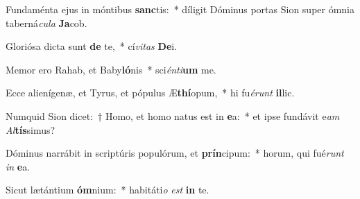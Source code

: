 \item Fundaménta ejus in móntibus \textbf{sanc}tis:~* díligit Dóminus portas Sion super ómnia taberná\textit{cu}\textit{la} \textbf{Ja}cob.
\item Gloriósa dicta sunt \textbf{de} te,~* cí\textit{vi}\textit{tas} \textbf{De}i.
\item Memor ero Rahab, et Baby\textbf{ló}nis~* sci\textit{én}\textit{ti}\textbf{um} me.
\item Ecce alienígenæ, et Tyrus, et pópulus Æ\textbf{thí}opum,~* hi fu\textit{é}\textit{runt} \textbf{il}lic.
\item Numquid Sion dicet:~† Homo, et homo natus est in \textbf{e}a:~* et ipse fundávit e\textit{am} \textit{Al}\textbf{tís}simus?
\item Dóminus narrábit in scriptúris populórum, et \textbf{prín}cipum:~* horum, qui fué\textit{runt} \textit{in} \textbf{e}a.
\item Sicut lætántium \textbf{óm}nium:~* habitáti\textit{o} \textit{est} \textbf{in} te.
